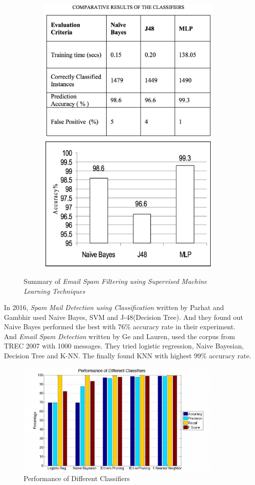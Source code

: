\begin{figure}[H]
	\begin{subfigure}{\textwidth}
		\centering
		\includegraphics[width=.4\linewidth]{./plots/2010-1.png}
		\includegraphics[width=.4\linewidth]{./plots/2010-2.png}
	\end{subfigure}%
	\caption{Summary of \textit{Email Spam Filtering using Supervised Machine Learning Techniques}}
	\label{paper_summary_2010}
\end{figure}



In 2016, \textit{Spam Mail Detection using Classification} written by Parhat and Gambhir used Naive Bayes, SVM and J-48(Decision Tree). And they found out Naive Bayes performed the best with 76\% accuracy rate in their experiment. \\ 
And \textit{Email Spam Detection} written by Ge and  Lauren, used the corpus from TREC 2007 with 1000 messages. They tried logistic regression, Naive Bayesian, Decision Tree and K-NN. The finally found KNN with highest 99\% accuracy rate. \\

\begin{figure}[H]
	\centering
	\includegraphics[width=10cm]{./plots/2016.png}
	\caption{Performance of Different Classifiers}
	\label{paper_summary_2016}
\end{figure}


